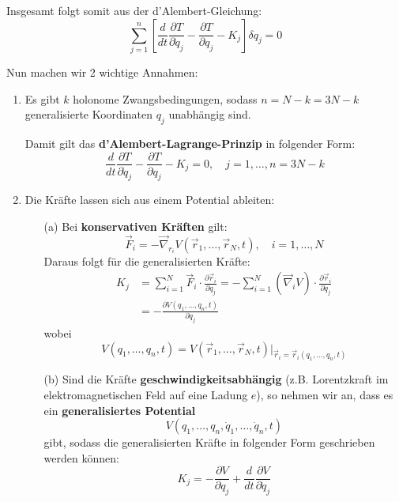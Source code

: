 \documentclass[10pt, letterpaper]{article}
\begin{document}
Insgesamt folgt somit aus der d'Alembert-Gleichung:
$$\sum_{j=1}^n \left[\frac{d}{dt} \frac{\partial T}{\partial \dot{q}_j} - \frac{\partial T}{\partial q_j} - K_j\right] \delta q_j = 0$$



Nun machen wir 2 wichtige Annahmen:
\begin{enumerate}[label=\textbf{\arabic*)}, left=0pt, align=left, itemsep=1.2em]

  \item Es gibt \( k \) holonome Zwangsbedingungen, sodass $n = N - k = 3N - k$ generalisierte Koordinaten \( q_j \) unabhängig sind.

  Damit gilt das \textbf{d'Alembert-Lagrange-Prinzip} in folgender Form:
  \begin{equation*}
  \frac{d}{dt} \frac{\partial T}{\partial \dot{q}_j} - \frac{\partial T}{\partial q_j} - K_j = 0, 
  \quad j = 1, \dotsc, n = 3N - k \tag{1}
  \end{equation*}

  \item Die Kräfte lassen sich aus einem Potential ableiten:

  \begin{itemize}
    \item[(a)] Bei \textbf{konservativen Kräften} gilt:
    \[
    \vec{F}_i = - \vec{\nabla}_{r_i} V(\vec{r}_1, \dotsc, \vec{r}_N, t), 
    \quad i = 1, \dotsc, N
    \]
    Daraus folgt für die generalisierten Kräfte:
    \[
    \begin{aligned}
    K_j &= \sum_{i=1}^N \vec{F}_i \cdot \frac{\partial \vec{r}_i}{\partial q_j}
    = -\sum_{i=1}^N (\vec{\nabla}_i V) \cdot \frac{\partial \vec{r}_i}{\partial q_j} \\
    &= -\frac{\partial V(q_1, \dotsc, q_n, t)}{\partial q_j}
    \end{aligned}
    \]
    wobei
    \[
    V(q_1, \dotsc, q_n, t) 
    = V(\vec{r}_1, \dotsc, \vec{r}_N, t)\big|_{\vec{r}_i = \vec{r}_i(q_1, \dotsc, q_n, t)}
    \]

    \item[(b)] Sind die Kräfte \textbf{geschwindigkeitsabhängig} (z.B. Lorentzkraft im elektromagnetischen Feld auf eine Ladung \( e \)), so nehmen wir an, dass es ein \textbf{generalisiertes Potential}
    \[
    V(q_1, \dotsc, q_n, \dot{q}_1, \dotsc, \dot{q}_n, t)
    \]
    gibt, sodass die generalisierten Kräfte in folgender Form geschrieben werden können:
    \begin{equation*}
    K_j = -\frac{\partial V}{\partial q_j} + \frac{d}{dt} \frac{\partial V}{\partial \dot{q}_j} \tag{2}
    \end{equation*}
  \end{itemize}

\end{enumerate}
\end{document}
